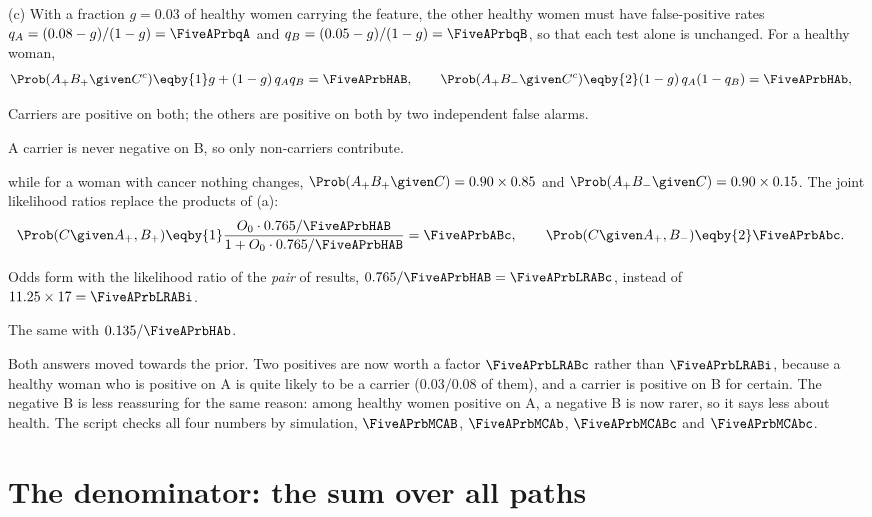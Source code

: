 (c) With a fraction $g=0.03$ of healthy women carrying the feature, the other healthy
women must have false-positive rates $q_A=(0.08-g)/(1-g)=\FiveAPrbqA$ and
$q_B=(0.05-g)/(1-g)=\FiveAPrbqB$, so that each test alone is unchanged. For a healthy
woman,
\begin{align*}
  \Prob(A_+B_+\given C^c)
  &\eqby{1}g+(1-g)\,q_Aq_B=\FiveAPrbHAB,
  \qquad
  \Prob(A_+B_-\given C^c)
  \eqby{2}(1-g)\,q_A(1-q_B)=\FiveAPrbHAb,
\end{align*}
\begin{explain}
  \item Carriers are positive on both; the others are positive on both by two
        independent false alarms.
  \item A carrier is never negative on B, so only non-carriers contribute.
\end{explain}
while for a woman with cancer nothing changes,
$\Prob(A_+B_+\given C)=0.90\times0.85$ and $\Prob(A_+B_-\given C)=0.90\times0.15$.
The joint likelihood ratios replace the products of (a):
\begin{align*}
  \Prob(C\given A_+,B_+)
  &\eqby{1}\frac{O_0\cdot0.765/\FiveAPrbHAB}{1+O_0\cdot0.765/\FiveAPrbHAB}
   =\FiveAPrbABc,
  \qquad
  \Prob(C\given A_+,B_-)
  \eqby{2}\FiveAPrbAbc .
\end{align*}
\begin{explain}
  \item Odds form with the likelihood ratio of the \emph{pair} of results,
        $0.765/\FiveAPrbHAB=\FiveAPrbLRABc$, instead of $11.25\times17=\FiveAPrbLRABi$.
  \item The same with $0.135/\FiveAPrbHAb$.
\end{explain}
Both answers moved towards the prior. Two positives are now worth a factor
$\FiveAPrbLRABc$ rather than $\FiveAPrbLRABi$, because a healthy woman who is positive
on A is quite likely to be a carrier ($0.03/0.08$ of them), and a carrier is positive on
B for certain. The negative B is less reassuring for the same reason: among healthy
women positive on A, a negative B is now rarer, so it says less about health. The
script checks all four numbers by simulation, $\FiveAPrbMCAB$, $\FiveAPrbMCAb$,
$\FiveAPrbMCABc$ and $\FiveAPrbMCAbc$.
\section{The denominator: the sum over all paths}
\label{5a:sec:denominator}

